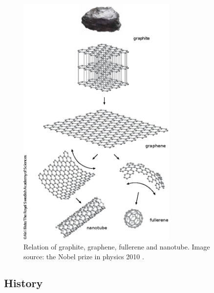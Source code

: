 \begin{figure}[htbp!] 
\centering  
\includegraphics[width=0.7\textwidth]{gra_grap.eps}
\caption{Relation of graphite, graphene, fullerene and nanotube. Image source: the Nobel prize in physics 2010 \cite{gra_grap}. }  
\label{fig:gra_grap}
\end{figure} 


\subsection{History}

